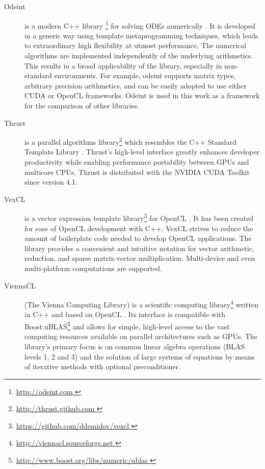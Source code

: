 \documentclass[final]{siamltex}
\begin{document}
\begin{description}
    \item[Odeint] is a modern C++ library \footnote{ \href{ http://odeint.com }{
        http://odeint.com } } for solving ODEs numerically \cite{OdeintRef1, OdeintRef2}.
        It is developed in a generic
        way using template metaprogramming techniques, which leads to extraordinary high
        flexibility at utmost performance. The numerical algorithms are
        implemented independently of the underlying arithmetics. This results
        in a broad applicability of the library, especially in non-standard
        environments.  For example, odeint supports matrix types, arbitrary
        precision arithmetics, and can be easily adopted to use either CUDA or
        OpenCL frameworks.  Odeint is used in this work as a framework for the
        comparison of other libraries.
    \item[Thrust] is a parallel algorithms library\footnote{ \href{
        http://thrust.github.com }{ http://thrust.github.com }} which resembles
        the C++ Standard Template Library \cite{ThrustRef}.  Thrust's
        high-level interface greatly enhances developer productivity while
        enabling performance portability between GPUs and multicore CPUs.
        Thrust is distributed with the NVIDIA CUDA Toolkit since version 4.1.
    \item[VexCL] is a vector expression template
        library\footnote{ \href{ https://github.com/ddemidov/vexcl }{
        https://github.com/ddemidov/vexcl }} for OpenCL \cite{VexCLRef}. It has
        been created for ease of OpenCL development with C++.  VexCL strives to
        reduce the amount of boilerplate code needed to develop OpenCL
        applications. The library provides a convenient and intuitive notation
        for vector arithmetic, reduction, and sparse matrix-vector
        multiplication.  Multi-device and even multi-platform computations are
        supported.
    \item[ViennaCL] (The Vienna Computing Library) is a scientific computing
        library\footnote{ \href{ http://viennacl.sourceforge.net }{
        http://viennacl.sourceforge.net }} written in C++ and based on OpenCL
        \cite{ViennaCLRef}. Its interface is compatible with
        Boost.uBLAS\footnote{ \href{ http://www.boost.org/libs/numeric/ublas }
        { http://www.boost.org/libs/numeric/ublas } }
        and allows for simple, high-level access to the vast
        computing resources available on parallel architectures such as GPUs.
        The library's primary focus is on common linear algebra operations (BLAS
        levels 1, 2 and 3) and the solution of large systems of equations by
        means of iterative methods with optional preconditioner.
\end{description}
\end{document}
